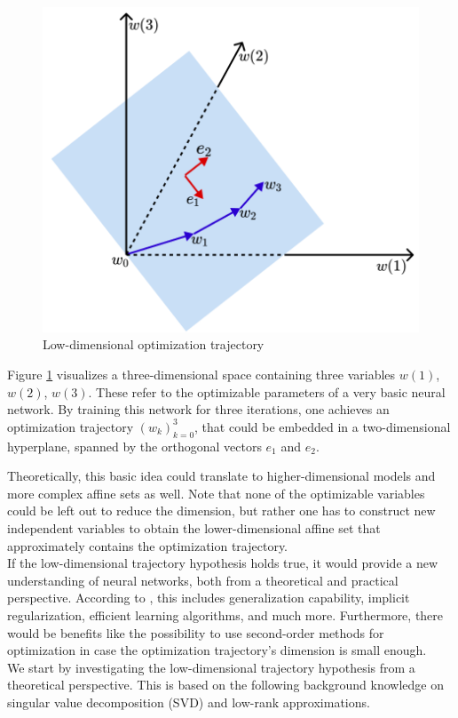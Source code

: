 \documentclass[11pt, a4paper]{article}
\begin{document}
\begin{figure}[!h]
\centering
\includegraphics[width=0.6\linewidth]{images/trajectory.png}
\caption{Low-dimensional optimization trajectory}
\label{fig:trajectory}
\end{figure}  

Figure \ref{fig:trajectory} visualizes a three-dimensional space containing three variables $w(1)$, $w(2)$, $w(3)$. These refer to the optimizable parameters of a very basic neural network. By training this network for three iterations, one achieves an optimization trajectory $(w_k)_{k=0}^3$, that could be embedded in a two-dimensional hyperplane, spanned by the orthogonal vectors $e_1$ and $e_2$.

Theoretically, this basic idea could translate to higher-dimensional models and more complex affine sets as well. Note that none of the optimizable variables could be left out to reduce the dimension, but rather one has to construct new independent variables to obtain the lower-dimensional affine set that approximately contains the optimization trajectory.  \\

If the low-dimensional trajectory hypothesis holds true, it would provide a new understanding of neural networks, both from a theoretical and practical perspective. According to \cite{Paper}, this includes generalization capability, implicit regularization, efficient learning algorithms, and much more. Furthermore, there would be benefits like the possibility to use second-order methods for optimization in case the optimization trajectory's dimension is small enough. \\

We start by investigating the low-dimensional trajectory hypothesis from a theoretical perspective. This is based on the following background knowledge on singular value decomposition (SVD) and low-rank approximations.
\end{document}
